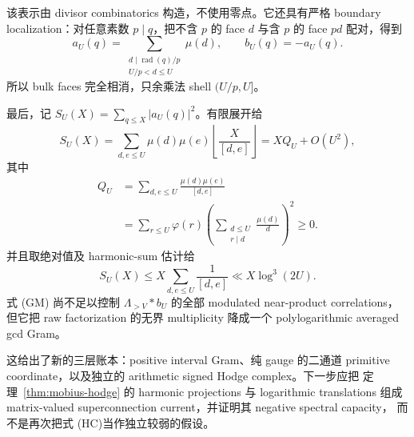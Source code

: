 该表示由 divisor combinatorics 构造，不使用零点。它还具有严格 boundary
localization：对任意素数 $p\mid q$，把不含 $p$ 的 face $d$ 与含 $p$ 的 face
$pd$ 配对，得到
\[
 a_U(q)=\sum_{\substack{d\mid\operatorname{rad}(q)/p\\U/p<d\leq U}}\mu(d),
 \qquad b_U(q)=-a_U(q).                            \tag{BS}
\]
所以 bulk faces 完全相消，只余乘法 shell $(U/p,U]$。

最后，记 $S_U(X)=\sum_{q\leq X}|a_U(q)|^2$。有限展开给
\[
 S_U(X)=\sum_{d,e\leq U}\mu(d)\mu(e)
          \left\lfloor\frac{X}{[d,e]}\right\rfloor
       =XQ_U+O(U^2),
\]
其中
\begin{align*}
 Q_U&=\sum_{d,e\leq U}\frac{\mu(d)\mu(e)}{[d,e]}\\
 &=\sum_{r\leq U}\varphi(r)
   \left(\sum_{\substack{d\leq U\\r\mid d}}\frac{\mu(d)}d\right)^2\geq0.
\end{align*}
并且取绝对值及 harmonic-sum 估计给
\[
 S_U(X)\leq X\sum_{d,e\leq U}\frac1{[d,e]}
 \ll X\log^3(2U).                                \tag{GM}
\]
式 (GM) 尚不足以控制 $\Lambda_{>V}*b_U$ 的全部 modulated near-product
correlations，但它把 raw factorization 的无界 multiplicity 降成一个
polylogarithmic averaged gcd Gram。

这给出了新的三层账本：positive interval Gram、纯 gauge 的二通道 primitive
coordinate，以及独立的 arithmetic signed Hodge complex。下一步应把
定理~\ref{thm:mobius-hodge} 的 harmonic projections 与 logarithmic translations
组成 matrix-valued superconnection current，并证明其 negative spectral capacity，
而不是再次把式 (HC)当作独立较弱的假设。
